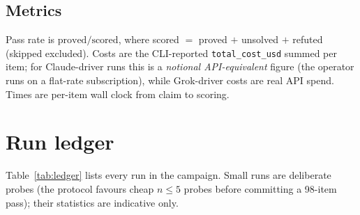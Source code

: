 \documentclass[12pt, a4paper]{article}
\begin{document}
\subsection{Metrics}

Pass rate is $\text{proved}/\text{scored}$, where scored $=$ proved $+$
unsolved $+$ refuted (skipped excluded). Costs are the CLI-reported
\texttt{total\_cost\_usd} summed per item; for Claude-driver runs this is a
\emph{notional API-equivalent} figure (the operator runs on a flat-rate
subscription), while Grok-driver costs are real API spend. Times are
per-item wall clock from claim to scoring.

\section{Run ledger}

Table~\ref{tab:ledger} lists every run in the campaign. Small runs are
deliberate probes (the protocol favours cheap $n{\le}5$ probes before
committing a 98-item pass); their statistics are indicative only.
\end{document}
